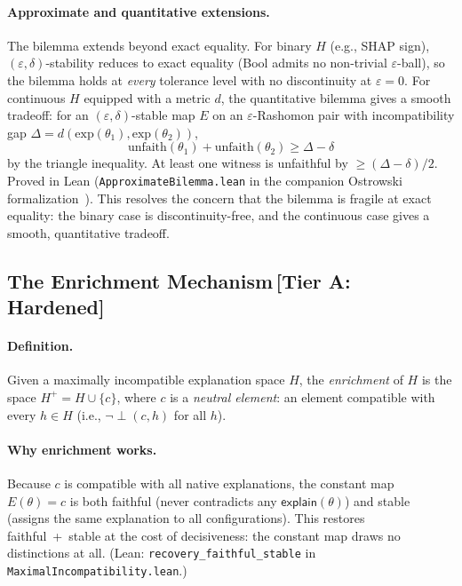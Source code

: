 \documentclass[11pt,a4paper]{article}
\newcommand{\incomp}{\perp}
\begin{document}
\paragraph{Approximate and quantitative extensions.}
The bilemma extends beyond exact equality. For binary $H$ (e.g., SHAP sign), $(\varepsilon, \delta)$-stability reduces to exact equality (Bool admits no non-trivial $\varepsilon$-ball), so the bilemma holds at \emph{every} tolerance level with no discontinuity at $\varepsilon = 0$. For continuous $H$ equipped with a metric $d$, the quantitative bilemma gives a smooth tradeoff: for an $(\varepsilon, \delta)$-stable map $E$ on an $\varepsilon$-Rashomon pair with incompatibility gap $\Delta = d(\text{exp}(\theta_1), \text{exp}(\theta_2))$,
$$\text{unfaith}(\theta_1) + \text{unfaith}(\theta_2) \geq \Delta - \delta$$
by the triangle inequality. At least one witness is unfaithful by $\geq (\Delta - \delta)/2$. Proved in Lean (\texttt{ApproximateBilemma.lean} in the companion Ostrowski formalization~\citep{caraker2026ostrowski}). This resolves the concern that the bilemma is fragile at exact equality: the binary case is discontinuity-free, and the continuous case gives a smooth, quantitative tradeoff.

\subsection{The Enrichment Mechanism\,\textnormal{\normalsize[Tier A: Hardened]}}
\label{sec:enrichment}

\paragraph{Definition.}
Given a maximally incompatible explanation space $H$, the \emph{enrichment} of $H$ is the space $H^+ = H \cup \{c\}$, where $c$ is a \emph{neutral element}: an element compatible with every $h \in H$ (i.e., $\lnot\incomp(c, h)$ for all $h$).

\paragraph{Why enrichment works.}
Because $c$ is compatible with all native explanations, the constant map $E(\theta) = c$ is both faithful (never contradicts any $\mathsf{explain}(\theta)$) and stable (assigns the same explanation to all configurations).  This restores faithful~+~stable at the cost of decisiveness: the constant map draws no distinctions at all.
(Lean: \texttt{recovery\_faithful\_stable} in \texttt{MaximalIncompatibility.lean}.)
\end{document}
